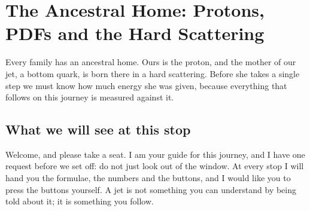 \chapter{The Ancestral Home: Protons, PDFs and the Hard Scattering}
\label{ch:ancestral_home}

\begin{journeybox}
Every family has an ancestral home. Ours is the proton, and the mother of our
jet, a bottom quark, is born there in a hard scattering. Before she takes a
single step we must know how much energy she was given, because everything
that follows on this journey is measured against it.
\end{journeybox}


\section{What we will see at this stop}
\label{sec:ancestral_home:what_we_compute}

Welcome, and please take a seat. I am your guide for this journey, and I have
one request before we set off: do not just look out of the window. At every
stop I will hand you the formulae, the numbers and the buttons, and I would
like you to press the buttons yourself. A jet is not something you can
understand by being told about it; it is something you follow.

